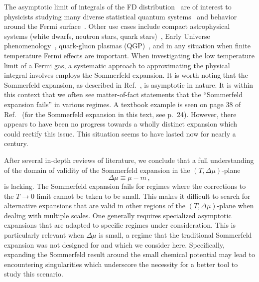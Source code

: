 \documentclass[sn-mathphys,Numbered]{sn-jnl}
\begin{document}
The asymptotic limit of integrals of the FD distribution~\cite{dingle1957fermi,dingle1973asymptotic} are of interest to physicists studying many diverse statistical quantum systems~\cite{10.1063/1.1350634,Lourenco:2007zza,10.1063/1.1665160,FUKUSHIMA2014417,GIL2022126618,GIL2023108563} and behavior around the Fermi surface~\cite{kim2008notes,PhysRevB.103.205154}. Other use cases include compact astrophysical systems (white dwarfs, neutron stars, quark stars)~\cite{Kaspi:2017fwg,Ferrer:2019xlr,Ferrer:2023pgq}, Early Universe phenomenology~\cite{Rafelski:2021aey,Rafelski:2023emw,Grayson:2023flr,Steinmetz:2023nsc}, quark-gluon plasmas (QGP)~\cite{Elze:1980er,Letessier:2002ony,Rafelski:2020ajx,Yang:2021bko}, and in any situation when finite temperature Fermi effects are important. When investigating the low temperature limit of a Fermi gas, a systematic approach to approximating the physical integral involves employs the Sommerfeld expansion. It is worth noting that the Sommerfeld expansion, as described in Ref.~\cite{landau2013statistical}, is asymptotic in nature. It is within this context that we often see matter-of-fact statements that the ``Sommerfeld expansion fails'' in various regimes. A  textbook example is seen on page 38 of Ref.~\cite{Kuebler:2021Th} (for the Sommerfeld expansion in this text, see p.~24). However, there appears to have been no progress towards a wholly distinct expansion which could rectify this issue. This situation seems to have lasted now for nearly a century. 

After several in-depth reviews of literature, we conclude that a full understanding of the domain of validity of the Sommerfeld expansion in the $(T,\Delta\mu)$-plane
\begin{equation}\label{DeltaMu}
\Delta\mu\equiv \mu-m\,,
\end{equation}
is lacking. The Sommerfeld expansion fails for regimes where the corrections to the $T\rightarrow0$ limit cannot be taken to be small. This makes it difficult to search for alternative expansions that are valid in other regions of the $(T,\Delta\mu)$-plane when dealing with multiple scales. One generally requires specialized asymptotic expansions that are adapted to specific regimes under consideration. This is particularly relevant when $\Delta\mu$ is small, a regime that the traditional Sommerfeld expansion was not designed for and which we consider here. Specifically, expanding the Sommerfeld result around the small chemical potential may lead to encountering singularities which underscore the necessity for a better tool to study this scenario. 
\end{document}
